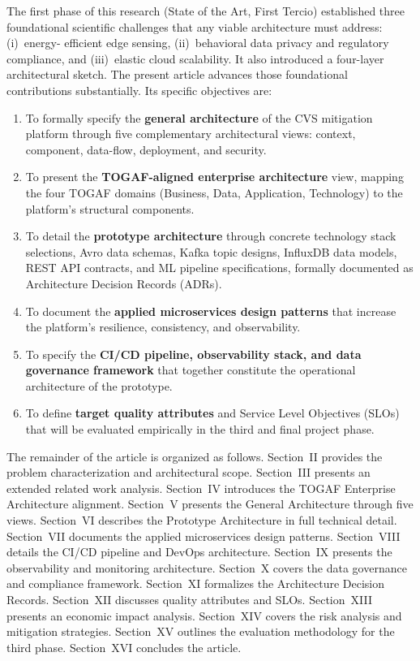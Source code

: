 \documentclass[conference]{IEEEtran}
\begin{document}
The first phase of this research (State of the Art, First Tercio) established three
foundational scientific challenges that any viable architecture must address: (i)~energy-
efficient edge sensing, (ii)~behavioral data privacy and regulatory compliance, and
(iii)~elastic cloud scalability. It also introduced a four-layer architectural sketch.
The present article advances those foundational contributions substantially. Its specific
objectives are:
\begin{enumerate}
  \item To formally specify the \textbf{general architecture} of the CVS mitigation
        platform through five complementary architectural views: context, component,
        data-flow, deployment, and security.
  \item To present the \textbf{TOGAF-aligned enterprise architecture} view, mapping the
        four TOGAF domains (Business, Data, Application, Technology) to the platform's
        structural components.
  \item To detail the \textbf{prototype architecture} through concrete technology stack
        selections, Avro data schemas, Kafka topic designs, InfluxDB data models,
        REST API contracts, and ML pipeline specifications, formally documented as
        Architecture Decision Records (ADRs).
  \item To document the \textbf{applied microservices design patterns} that increase
        the platform's resilience, consistency, and observability.
  \item To specify the \textbf{CI/CD pipeline, observability stack, and data governance
        framework} that together constitute the operational architecture of the prototype.
  \item To define \textbf{target quality attributes} and Service Level Objectives (SLOs)
        that will be evaluated empirically in the third and final project phase.
\end{enumerate}

The remainder of the article is organized as follows.
Section~II provides the problem characterization and architectural scope.
Section~III presents an extended related work analysis.
Section~IV introduces the TOGAF Enterprise Architecture alignment.
Section~V presents the General Architecture through five views.
Section~VI describes the Prototype Architecture in full technical detail.
Section~VII documents the applied microservices design patterns.
Section~VIII details the CI/CD pipeline and DevOps architecture.
Section~IX presents the observability and monitoring architecture.
Section~X covers the data governance and compliance framework.
Section~XI formalizes the Architecture Decision Records.
Section~XII discusses quality attributes and SLOs.
Section~XIII presents an economic impact analysis.
Section~XIV covers the risk analysis and mitigation strategies.
Section~XV outlines the evaluation methodology for the third phase.
Section~XVI concludes the article.
\end{document}
